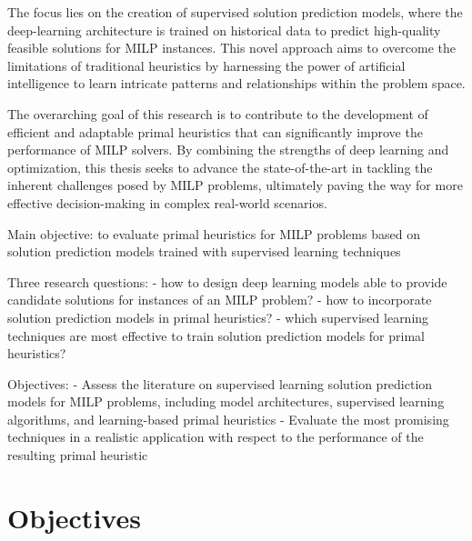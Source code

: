 The focus lies on the creation of supervised solution prediction models, where the deep-learning architecture is trained on historical data to predict high-quality feasible solutions for MILP instances.
This novel approach aims to overcome the limitations of traditional heuristics by harnessing the power of artificial intelligence to learn intricate patterns and relationships within the problem space.

The overarching goal of this research is to contribute to the development of efficient and adaptable primal heuristics that can significantly improve the performance of MILP solvers.
By combining the strengths of deep learning and optimization, this thesis seeks to advance the state-of-the-art in tackling the inherent challenges posed by MILP problems, ultimately paving the way for more effective decision-making in complex real-world scenarios.


Main objective: to evaluate primal heuristics for MILP problems based on solution prediction models trained with supervised learning techniques

Three research questions:
- how to design deep learning models able to provide candidate solutions for instances of an MILP problem?
- how to incorporate solution prediction models in primal heuristics?
- which supervised learning techniques are most effective to train solution prediction models for primal heuristics?

Objectives:
- Assess the literature on supervised learning solution prediction models for MILP problems, including model architectures, supervised learning algorithms, and learning-based primal heuristics
- Evaluate the most promising techniques in a realistic application with respect to the performance of the resulting primal heuristic

\section{Objectives}\label{chap:objectives}


